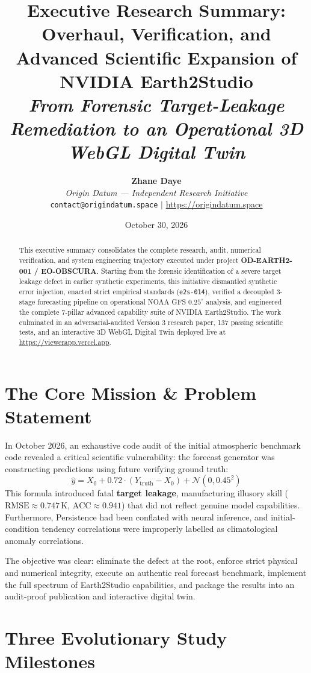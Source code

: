 \documentclass[10pt,twocolumn,a4paper]{article}
\title{\vspace{-1.0cm}\textbf{\Large Executive Research Summary: Overhaul, Verification, and Advanced Scientific Expansion of NVIDIA Earth2Studio}\\
\large\textit{From Forensic Target-Leakage Remediation to an Operational 3D WebGL Digital Twin}}
\author{
    \textbf{Zhane Daye}\\
    \textit{Origin Datum --- Independent Research Initiative}\\
    \texttt{contact@origindatum.space} \quad $|$ \quad \url{https://origindatum.space}
}
\date{October 30, 2026}
\begin{document}
\maketitle

\begin{abstract}
\noindent
This executive summary consolidates the complete research, audit, numerical verification, and system engineering trajectory executed under project \textbf{OD-EARTH2-001 / EO-OBSCURA}. Starting from the forensic identification of a severe target leakage defect in earlier synthetic experiments, this initiative dismantled synthetic error injection, enacted strict empirical standards (\texttt{e2s-014}), verified a decoupled 3-stage forecasting pipeline on operational NOAA GFS $0.25^\circ$ analysis, and engineered the complete 7-pillar advanced capability suite of NVIDIA Earth2Studio. The work culminated in an adversarial-audited Version 3 research paper, 137 passing scientific tests, and an interactive 3D WebGL Digital Twin deployed live at \url{https://viewerapp.vercel.app}.
\end{abstract}

\section{The Core Mission \& Problem Statement}

In October 2026, an exhaustive code audit of the initial atmospheric benchmark code revealed a critical scientific vulnerability: the forecast generator was constructing predictions using future verifying ground truth:
\begin{equation}
\hat{y} = X_0 + 0.72 \cdot (Y_{\text{truth}} - X_0) + \mathcal{N}(0, 0.45^2)
\end{equation}
This formula introduced fatal \textbf{target leakage}, manufacturing illusory skill ($\text{RMSE} \approx 0.747\,\text{K}$, $\text{ACC} \approx 0.941$) that did not reflect genuine model capabilities. Furthermore, Persistence had been conflated with neural inference, and initial-condition tendency correlations were improperly labelled as climatological anomaly correlations.

The objective was clear: eliminate the defect at the root, enforce strict physical and numerical integrity, execute an authentic real forecast benchmark, implement the full spectrum of Earth2Studio capabilities, and package the results into an audit-proof publication and interactive digital twin.

\section{Three Evolutionary Study Milestones}
\end{document}
